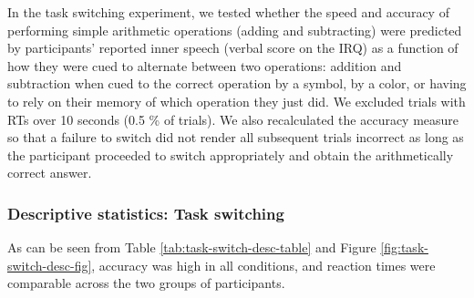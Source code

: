 \documentclass[
  man,a4paper,floatsintext]{apa6}
\begin{document}
In the task switching experiment, we tested whether the speed and accuracy of performing simple arithmetic operations (adding and subtracting) were predicted by participants' reported inner speech (verbal score on the IRQ) as a function of how they were cued to alternate between two operations: addition and subtraction when cued to the correct operation by a symbol, by a color, or having to rely on their memory of which operation they just did. We excluded trials with RTs over 10 seconds (0.5 \% of trials). We also recalculated the accuracy measure so that a failure to switch did not render all subsequent trials incorrect as long as the participant proceeded to switch appropriately and obtain the arithmetically correct answer.

\hypertarget{descriptive-statistics-task-switching}{%
\subsubsection{Descriptive statistics: Task switching}\label{descriptive-statistics-task-switching}}

As can be seen from Table \ref{tab:task-switch-desc-table} and Figure \ref{fig:task-switch-desc-fig}, accuracy was high in all conditions, and reaction times were comparable across the two groups of participants.
\end{document}
